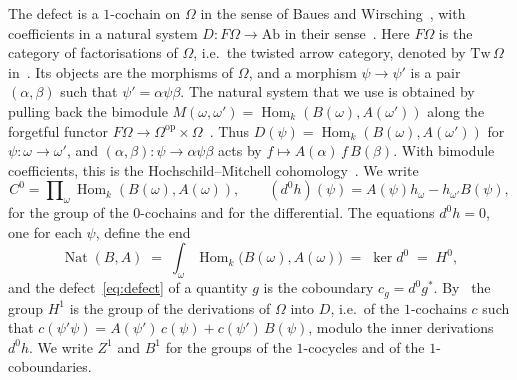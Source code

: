 \documentclass[11pt,a4paper]{article}
\theoremstyle{plain}
\theoremstyle{definition}
\theoremstyle{remark}
\newcommand{\cat}[1]{\mathsf{#1}}
\newcommand{\catO}{\cat{\Omega}}
\newcommand{\op}{\mathrm{op}}
\DeclareMathOperator{\Nat}{Nat}
\DeclareMathOperator{\Hom}{Hom}
\begin{document}
The defect is a $1$-cochain on $\catO$ in the sense of Baues and
Wirsching~\cite[(1.4)]{baues_cohomology_1985}, with coefficients in a natural
system $D \colon F\catO \to \mathrm{Ab}$ in their
sense~\cite[(1.2)]{baues_cohomology_1985}. Here $F\catO$ is the category of
factorisations of $\catO$, i.e.\ the twisted arrow category, denoted by
$\mathrm{Tw}\,\catO$ in~\cite{caputi_diagrammatic_2025}. Its objects are the
morphisms of $\catO$, and a morphism $\psi \to \psi'$ is a pair
$(\alpha,\beta)$ such that $\psi' = \alpha\psi\beta$. The natural system that
we use is obtained by pulling back the bimodule
$M(\omega,\omega') = \Hom_k(B(\omega),A(\omega'))$ along the forgetful functor
$F\catO \to \catO^{\op} \times \catO$~\cite[(1.16)--(1.18)]{baues_cohomology_1985}.
Thus $D(\psi) = \Hom_k(B(\omega),A(\omega'))$ for
$\psi \colon \omega \to \omega'$, and
$(\alpha,\beta) \colon \psi \to \alpha\psi\beta$ acts by
$f \mapsto A(\alpha)\,f\,B(\beta)$. With bimodule coefficients, this is the
Hochschild--Mitchell cohomology~\cite[(8.5)]{baues_cohomology_1985}. We write
\[
C^{0} = \prod\nolimits_\omega \Hom_k(B(\omega),A(\omega)),
\qquad
(d^{0}h)(\psi) = A(\psi)h_\omega - h_{\omega'}B(\psi),
\]
for the group of the $0$-cochains and for the differential. The equations
$d^{0}h = 0$, one for each $\psi$, define the
end~\cite[IX.5]{maclane_categories_1998}
\begin{equation}\label{eq:H0}
\Nat(B,A) \;=\; \int_{\omega} \Hom_k\bigl(B(\omega),A(\omega)\bigr)
\;=\; \ker d^{0} \;=\; H^{0},
\end{equation}
and the defect~\eqref{eq:defect} of a quantity $g$ is the coboundary
$c_g = d^{0}g^{*}$. By~\cite[(5.3)--(5.6)]{baues_cohomology_1985} the group
$H^{1}$ is the group of the derivations of $\catO$ into $D$, i.e.\ of the
$1$-cochains $c$ such that
$c(\psi'\psi) = A(\psi')\,c(\psi) + c(\psi')\,B(\psi)$, modulo the inner
derivations $d^{0}h$. We write $Z^{1}$ and $B^{1}$ for the groups of the
$1$-cocycles and of the $1$-coboundaries.
\end{document}
